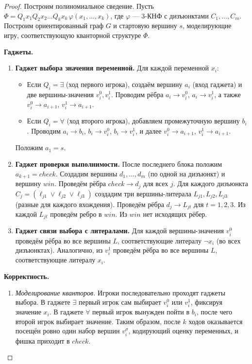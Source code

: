 \begin{proof}
    Построим полиномиальное сведение. Пусть \(\Phi = Q_1x_1 Q_2x_2 \dots Q_kx_k \, \varphi(x_1,\dots,x_k)\), где \(\varphi\) — 3-КНФ с дизъюнктами \(C_1,\dots,C_m\). Построим ориентированный граф \(G\) и стартовую вершину \(s\), моделирующие игру, соответствующую кванторной структуре \(\Phi\).

    \textbf{Гаджеты.}
    \begin{enumerate}
        \item \textbf{Гаджет выбора значения переменной.} Для каждой переменной \(x_i\):
        \begin{itemize}
            \item Если \(Q_i = \exists\) (ход первого игрока), создаём вершину \(a_i\) (вход гаджета) и две вершины-значения \(v_i^0, v_i^1\). Проводим рёбра \(a_i \to v_i^0\), \(a_i \to v_i^1\), а также \(v_i^0 \to a_{i+1}\), \(v_i^1 \to a_{i+1}\).
            \item Если \(Q_i = \forall\) (ход второго игрока), добавляем промежуточную вершину \(b_i\). Проводим \(a_i \to b_i\), \(b_i \to v_i^0\), \(b_i \to v_i^1\), и далее \(v_i^0 \to a_{i+1}\), \(v_i^1 \to a_{i+1}\).
        \end{itemize}
        Положим \(a_1 = s\).

        \item \textbf{Гаджет проверки выполнимости.} После последнего блока положим \(a_{k+1} = \mathit{check}\). Создадим вершины \(d_1,\dots,d_m\) (по одной на дизъюнкт) и вершину \(\mathit{win}\). Проведём рёбра \(\mathit{check} \to d_j\) для всех \(j\). Для каждого дизъюнкта \(C_j = (\ell_{j1} \lor \ell_{j2} \lor \ell_{j3})\) создадим три вершины-литерала \(L_{j1},L_{j2},L_{j3}\) (разные для каждого вхождения). Проведём рёбра \(d_j \to L_{jt}\) для \(t=1,2,3\). Из каждой \(L_{jt}\) проведём ребро в \(\mathit{win}\). Из \(\mathit{win}\) нет исходящих рёбер.

        \item \textbf{Гаджет связи выбора с литералами.} Для каждой вершины-значения \(v_i^0\) проведём рёбра во все вершины \(L\), соответствующие литералу \(\neg x_i\) (во всех дизъюнктах). Аналогично, из \(v_i^1\) проведём рёбра во все вершины \(L\), соответствующие литералу \(x_i\).
    \end{enumerate}

    \textbf{Корректность.}
    \begin{enumerate}
        \item \textit{Моделирование кванторов.} Игроки последовательно проходят гаджеты выбора. В гаджете \(\exists\) первый игрок сам выбирает \(v_i^0\) или \(v_i^1\), фиксируя значение \(x_i\). В гаджете \(\forall\) первый игрок вынужден пойти в \(b_i\), после чего второй игрок выбирает значение. Таким образом, после \(k\) ходов оказывается посещён ровно один набор вершин \(v_i^\sigma\), кодирующий оценку переменных, и фишка приходит в \(\mathit{check}\).


\end{enumerate}
\end{proof}
